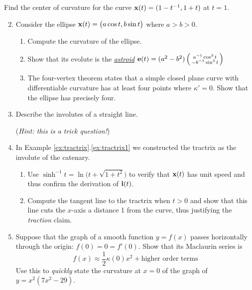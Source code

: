 \goodbreak




\begin{exercises}
\exstart Find the center of curvature for the curve ${\mathbf{x}}(t)=(1-t^{-1},1+t)$ at $t=1$.


\begin{enumerate}\setcounter{enumi}{1}
  \item Consider the ellipse ${\mathbf{x}}(t)=\bigl(a\cos t,b\sin t\bigr)$ where $a>b>0$.
  \begin{enumerate}
    \item Compute the curvature of the ellipse.
    
    \item Show that its evolute is the \emph{\href{https://en.wikipedia.org/wiki/Astroid}{astroid}} ${\mathbf{e}}(t)=(a^2-b^2)\left(\begin{smallmatrix}a^{-1}\cos^3t\\-b^{-1}\sin^3t\end{smallmatrix}\right)$
    
    \item The four-vertex theorem states that a simple closed plane curve with differentiable curvature has at least four points where $\kappa'=0$. Show that the ellipse has precisely four.
  \end{enumerate}
  
  
  \item Describe the involutes of a straight line.\par
  (\emph{Hint: this is a trick question!})
  
 
	\item In Example \ref*{ex:tractrix}.\ref{ex:tractrix1} we constructed the tractrix as the involute of the catenary.
	\begin{enumerate}
	  \item Use $\sinh^{-1}\!t=\ln\bigl(t+\sqrt{1+t^2}\bigr)$ to verify that ${\mathbf{x}}(t)$ has unit speed and thus confirm the derivation of ${\mathbf{i}}(t)$.
	  
	  \item Compute the tangent line to the tractrix when $t>0$ and show that this line cuts the $x$-axis a distance 1 from the curve, thus justifying the \emph{traction} claim.
	  
 	\end{enumerate}


	\item\label{exs:curvetaylor} Suppose that the graph of a smooth function $y=f(x)$ passes horizontally through the origin: $f(0)=0=f'(0)$. Show that its Maclaurin series is
	\[f(x)\approx \frac 12\kappa(0)x^2+\text{higher order terms}\]
	Use this to \emph{quickly} state the curvature at $x=0$ of the graph of $y=x^2(7x^2-29)$.



\end{enumerate}
\end{exercises}
